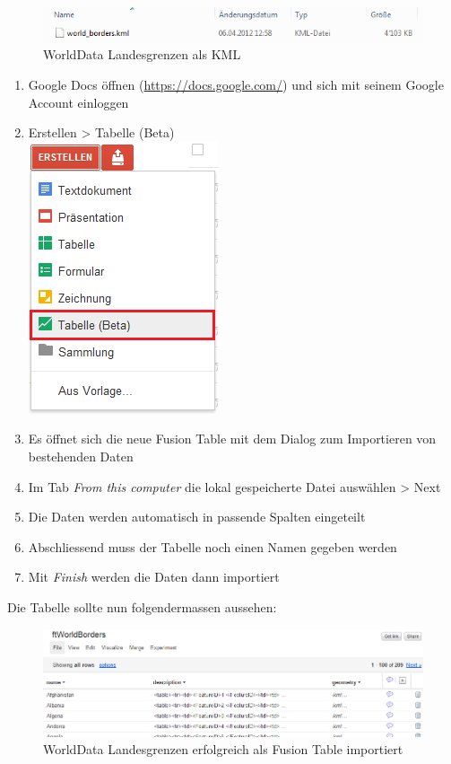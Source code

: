 \begin{figure}[!h]
	\centering
	\includegraphics{images/usecase1-worlddata/worlddata-worldborders_kml.png}
	\caption{WorldData Landesgrenzen als KML}
	\label{worlddata-worldborders_kml}
\end{figure}

\begin{enumerate}
\item Google Docs öffnen (\url{https://docs.google.com/}) und sich mit seinem Google Account einloggen
\item Erstellen > Tabelle (Beta) \\ \includegraphics{images/usecase1-worlddata/worlddata-worldborders_import1.png}
\item Es öffnet sich die neue Fusion Table mit dem Dialog zum Importieren von bestehenden Daten
\item Im Tab \emph{From this computer} die lokal gespeicherte Datei auswählen > Next
\item Die Daten werden automatisch in passende Spalten eingeteilt
\item Abschliessend muss der Tabelle noch einen Namen gegeben werden
\item Mit \emph{Finish} werden die Daten dann importiert
\end{enumerate}

Die Tabelle sollte nun folgendermassen aussehen:

\begin{figure}[!h]
	\centering
	\includegraphics[scale=0.65]{images/usecase1-worlddata/worlddata-worldborders_import_done.png}
	\caption{WorldData Landesgrenzen erfolgreich als Fusion Table importiert}
	\label{worlddata-worldborders_import_done}
\end{figure}

